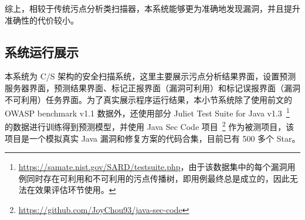 综上，相较于传统污点分析类扫描器，本系统能够更为准确地发现漏洞，并且提升准确性的代价较小。


%
%
%

\subsection{系统运行展示}

本系统为 C/S 架构的安全扫描系统，这里主要展示污点分析结果界面，设置预测服务器界面，预测结果界面、标记正报界面（漏洞可利用）和标记误报界面（漏洞不可利用）任务界面。为了真实展示程序运行结果，本小节系统除了使用前文的 OWASP benchmark v1.1 数据外，还使用部分 Juliet Test Suite for Java v1.3~\footnote{\url{https://samate.nist.gov/SARD/testsuite.php}，由于该数据集中的每个漏洞用例同时存在可利用和不可利用的污点传播树，即用例最终总是成立的，因此无法在效果评估环节使用。} 的数据进行训练得到预测模型，并使用 Java Sec Code 项目~\footnote{\url{https://github.com/JoyChou93/java-sec-code}} 作为被测项目，该项目是一个模拟真实 Java 漏洞和修复方案的代码合集，目前已有 500 多个 Star。

